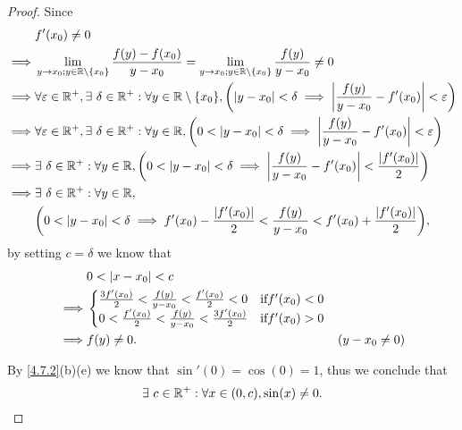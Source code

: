 \begin{proof}
  Since
  \begin{align*}
             & f'(x_0) \neq 0                                                                                                                                                                              \\
    \implies & \lim_{y \to x_0 ; y \in \R \setminus \{x_0\}} \frac{f(y) - f(x_0)}{y - x_0} = \lim_{y \to x_0 ; y \in \R \setminus \{x_0\}} \frac{f(y)}{y - x_0} \neq 0                                     \\
    \implies & \forall \varepsilon \in \R^+, \exists\ \delta \in \R^+ : \forall y \in \R \setminus \{x_0\}, \bigg(\abs{y - x_0} < \delta \implies \abs{\frac{f(y)}{y - x_0} - f'(x_0)} < \varepsilon\bigg) \\
    \implies & \forall \varepsilon \in \R^+, \exists\ \delta \in \R^+ : \forall y \in \R, \bigg(0 < \abs{y - x_0} < \delta \implies \abs{\frac{f(y)}{y - x_0} - f'(x_0)} < \varepsilon\bigg)               \\
    \implies & \exists\ \delta \in \R^+ : \forall y \in \R, \bigg(0 < \abs{y - x_0} < \delta \implies \abs{\frac{f(y)}{y - x_0} - f'(x_0)} < \frac{\abs{f'(x_0)}}{2}\bigg)                                 \\
    \implies & \exists\ \delta \in \R^+ : \forall y \in \R,                                                                                                                                                \\
             & \bigg(0 < \abs{y - x_0} < \delta \implies f'(x_0) - \frac{\abs{f'(x_0)}}{2} < \frac{f(y)}{y - x_0} < f'(x_0) + \frac{\abs{f'(x_0)}}{2}\bigg),
  \end{align*}
  by setting \(c = \delta\) we know that
  \begin{align*}
             & 0 < \left\lvert x - x_0\right\rvert < c                                                                                            \\
    \implies & \begin{cases}
                 \frac{3 f'(x_0)}{2} < \frac{f(y)}{y - x_0} < \frac{f'(x_0)}{2} < 0 & \text{if} f'(x_0) < 0 \\
                 0 < \frac{f'(x_0)}{2} < \frac{f(y)}{y - x_0} < \frac{3 f'(x_0)}{2} & \text{if} f'(x_0) > 0
               \end{cases}                       \\
    \implies & f(y) \neq 0.                                                                                  & (y - x_0 \neq 0)
  \end{align*}

  By \cref{4.7.2}(b)(e) we know that \(\sin'(0) = \cos(0) = 1\), thus we conclude that
  \[
    \exists\ c \in \mathbb{R}^+ : \forall x \in (0, c), \sin(x) \neq 0.
  \]
\end{proof}

